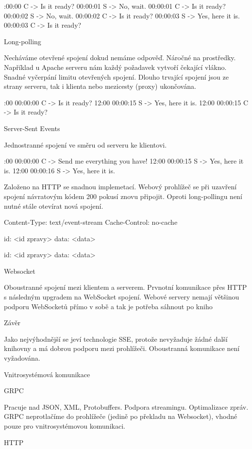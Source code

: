 :00:00 C -> Is it ready? 
00:00:01 S -> No, wait.
00:00:01 C -> Is it ready?
00:00:02 S -> No, wait.
00:00:02 C -> Is it ready? 
00:00:03 S -> Yes, here it is.
00:00:03 C -> Is it ready?
\endtt

\secc Long-polling

Necháváme otevřené spojení dokud nemáme odpověď.
Náročné na prostředky.
Například u Apache serveru nám každý požadavek vytvoří čekající vlákno.
Snadné vyčerpání limitu otevřených spojení.
Dlouho trvající spojení jsou ze strany serveru, tak i klienta nebo mezicesty (proxy) ukončována.

:00 00:00:00 C -> Is it ready? 
12:00 00:00:15 S -> Yes, here it is.
12:00 00:00:15 C -> Is it ready?
\endtt

\secc Server-Sent Events

Jednostranné spojení ve směru od serveru ke klientovi.

:00 00:00:00 C -> Send me everything you have!
12:00 00:00:15 S -> Yes, here it is.
12:00 00:00:16 S -> Yes, here it is.
\endtt

\noindent
Založeno na HTTP se snadnou implemetací.
Webový prohlížeč se při uzavření spojení návratovým kódem 200 pokusí znovu připojit.
Oproti long-pollingu není nutné stále otevírat nová spojení.

\begtt
Content-Type: text/event-stream
Cache-Control: no-cache

id: <id zpravy>
data: <data>

id: <id zpravy>
data: <data>
\endtt

\secc Websocket

Oboustranné spojení mezi klientem a serverem.
Prvnotní komunikace přes HTTP s následným upgradem na WebSocket spojení.
Webové servery nemají většinou podporu WebSocketů přímo v sobě a tak je potřeba sáhnout po kniho

\secc Závěr

Jako nejvýhodnější se jeví technologie SSE, protože nevyžaduje žádné další knihovny a má dobrou podporu mezi prohlížeči.
Oboustranná komunikace není vyžadována.

\sec Vnitrosystémová komunikace

\secc GRPC

Pracuje nad JSON, XML, Protobuffers.
Podpora streamingu.
Optimalizace zpráv.
GRPC neprotlačíme do prohlížeče (jedině po překladu na Websocket), vhodné pouze pro vnitrosystémovou komunikaci.

\secc HTTP


